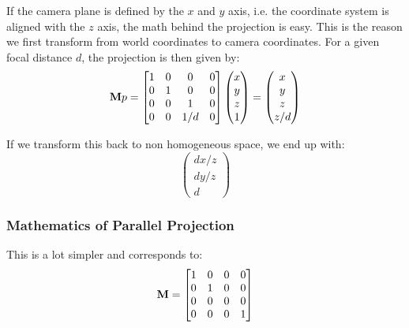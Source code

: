 If the camera plane is defined by the $x$ and $y$ axis, i.e. the coordinate system is aligned with the $z$ axis, the math behind the projection is easy. This is the reason we first transform from world coordinates to camera coordinates. For a given focal distance $d$, the projection is then given by:
$$\textbf M p = \begin{bmatrix}
	1 & 0 & 0 & 0 \\
	0 & 1 & 0 & 0 \\
	0 & 0 & 1 & 0 \\
	0 & 0 & 1/d & 0
\end{bmatrix} \begin{pmatrix}
	x \\ y \\ z \\ 1
\end{pmatrix} = \begin{pmatrix}
	x \\ y \\ z \\ z / d
\end{pmatrix}$$

If we transform this back to non homogeneous space, we end up with:
$$\begin{pmatrix}
	dx / z \\ dy / z \\ d
\end{pmatrix}$$

\subsubsection{Mathematics of Parallel Projection}

This is a lot simpler and corresponds to:
$$\textbf M = \begin{bmatrix}
	1 & 0 & 0 & 0 \\
	0 & 1 & 0 & 0 \\
	0 & 0 & 0 & 0 \\
	0 & 0 & 0 & 1
\end{bmatrix}$$



